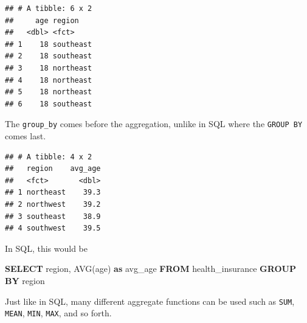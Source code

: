 \documentclass[openany]{book}
\newenvironment{Shaded}{\begin{snugshade}}{\end{snugshade}}
\newcommand{\DataTypeTok}[1]{\textcolor[rgb]{0.13,0.29,0.53}{#1}}
\newcommand{\FunctionTok}[1]{\textcolor[rgb]{0.00,0.00,0.00}{#1}}
\newcommand{\KeywordTok}[1]{\textcolor[rgb]{0.13,0.29,0.53}{\textbf{#1}}}
\newcommand{\NormalTok}[1]{#1}
\newcommand{\OperatorTok}[1]{\textcolor[rgb]{0.81,0.36,0.00}{\textbf{#1}}}
\newcommand{\StringTok}[1]{\textcolor[rgb]{0.31,0.60,0.02}{#1}}
\begin{document}
\begin{Shaded}
\end{Shaded}

\begin{verbatim}
## # A tibble: 6 x 2
##     age region   
##   <dbl> <fct>    
## 1    18 southeast
## 2    18 southeast
## 3    18 northeast
## 4    18 northeast
## 5    18 northeast
## 6    18 southeast
\end{verbatim}

The \texttt{group\_by} comes before the aggregation, unlike in SQL where the \texttt{GROUP\ BY} comes last.

\begin{Shaded}
\end{Shaded}

\begin{verbatim}
## # A tibble: 4 x 2
##   region    avg_age
##   <fct>       <dbl>
## 1 northeast    39.3
## 2 northwest    39.2
## 3 southeast    38.9
## 4 southwest    39.5
\end{verbatim}

In SQL, this would be

\begin{Shaded}
\begin{Highlighting}[]
\KeywordTok{SELECT}\NormalTok{ region, }
       \FunctionTok{AVG}\NormalTok{(age) }\KeywordTok{as}\NormalTok{ avg_age}
\KeywordTok{FROM}\NormalTok{ health_insurance}
\KeywordTok{GROUP} \KeywordTok{BY}\NormalTok{ region}
\end{Highlighting}
\end{Shaded}

Just like in SQL, many different aggregate functions can be used such as \texttt{SUM}, \texttt{MEAN}, \texttt{MIN}, \texttt{MAX}, and so forth.
\end{document}
